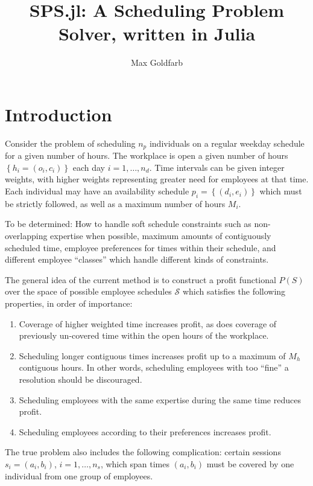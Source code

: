 \documentclass[11pt, draft]{amsart}
\title{SPS.jl: A Scheduling Problem Solver, written in Julia}
\author{Max Goldfarb}
\newcommand{\bk}[1]{\left\{#1\right\}}
\def\S{\mathcal{S}}
\begin{document}
\maketitle%

\section{Introduction}
Consider the problem of scheduling $n_p$ individuals on a regular weekday
schedule for a given number of hours.
The workplace is open a given number of hours $\bk{h_i=(o_i, c_i)}$ each day
$i=1,\ldots,n_d$.
Time intervals can be given integer weights, with higher weights representing
greater need for employees at that time.
Each individual may have an availability schedule $p_i=\bk{(d_i, e_i)}$ which
must be strictly followed, as well as a maximum number of hours $M_i$.

To be determined: How to handle soft schedule constraints such as
non-overlapping expertise when possible, maximum amounts of contiguously
scheduled time, employee preferences for times within their schedule, and
different employee ``classes'' which handle different kinds of constraints.

The general idea of the current method is to construct a profit functional $P(S)$ 
over the space of possible employee schedules $\S$ which satisfies the 
following properties, in order of importance:
\begin{enumerate}
  \item Coverage of higher weighted time increases profit, as does coverage of
  previously un-covered time within the open hours of the workplace.
  \item Scheduling longer contiguous times increases profit up to a maximum of
   $M_h$ contiguous hours.
  In other words, scheduling employees with too ``fine'' a resolution should be discouraged.
  \item Scheduling employees with the same expertise during the same time reduces
  profit.
  \item Scheduling employees according to their preferences increases profit.
\end{enumerate}

The true problem also includes the following complication: certain sessions
${s_i=(a_i, b_i)}$, $i=1,\ldots,n_s$, which span times $(a_i, b_i)$ must be
covered by one individual from one group of employees.%
\end{document}
